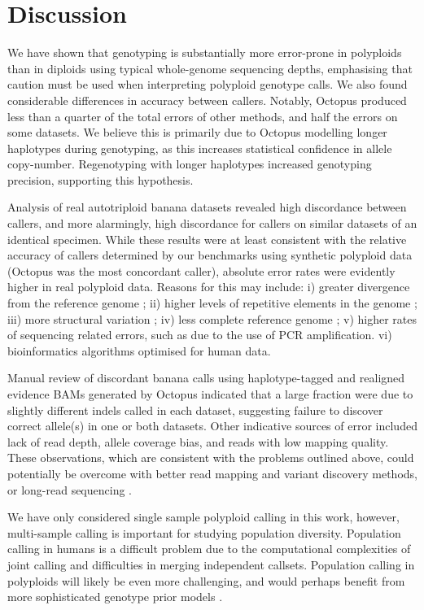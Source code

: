 \documentclass[notitlepage, twocolumn, 10pt]{article}
\begin{document}
\section*{Discussion}

We have shown that genotyping is substantially more error-prone in polyploids than in diploids using typical whole-genome sequencing depths, emphasising that caution must be used when interpreting polyploid genotype calls. We also found considerable differences in accuracy between callers. Notably, Octopus produced less than a quarter of the total errors of other methods, and half the errors on some datasets. We believe this is primarily due to Octopus modelling longer haplotypes during genotyping, as this increases statistical confidence in allele copy-number. Regenotyping with longer haplotypes increased genotyping precision, supporting this hypothesis.

Analysis of real autotriploid banana datasets revealed high discordance between callers, and more alarmingly, high discordance for callers on similar datasets of an identical specimen. While these results were at least consistent with the relative accuracy of callers determined by our benchmarks using synthetic polyploid data (Octopus was the most concordant caller), absolute error rates were evidently higher in real polyploid data. Reasons for this may include: i) greater divergence from the reference genome \cite{RN670}; ii) higher levels of repetitive elements in the genome \cite{RN676}; iii) more structural variation \cite{RN670}; iv) less complete reference genome \cite{RN676}; v) higher rates of sequencing related errors, such as due to the use of PCR amplification. vi) bioinformatics algorithms optimised for human data.

Manual review of discordant banana calls using haplotype-tagged and realigned evidence BAMs generated by Octopus indicated that a large fraction were due to slightly different indels called in each dataset, suggesting failure to discover correct allele(s) in one or both datasets. Other indicative sources of error included lack of read depth, allele coverage bias, and reads with low mapping quality. These observations, which are consistent with the problems outlined above, could potentially be overcome with better read mapping \cite{RN787} and variant discovery methods, or long-read sequencing \cite{RN650}.

We have only considered single sample polyploid calling in this work, however, multi-sample calling is  important for studying population diversity. Population calling in humans is a difficult problem due to the computational complexities of joint calling and difficulties in merging independent callsets. Population calling in polyploids will likely be even more challenging, and would perhaps benefit from  more sophisticated genotype prior models \cite{RN666}.
\end{document}
